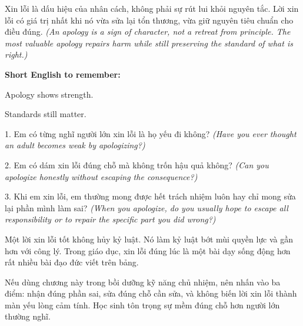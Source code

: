 \begin{baihoc}
Xin lỗi là dấu hiệu của nhân cách, không phải sự rút lui khỏi nguyên tắc. Lời xin lỗi có giá trị nhất khi nó vừa sửa lại tổn thương, vừa giữ nguyên tiêu chuẩn cho điều đúng.
\textit{(An apology is a sign of character, not a retreat from principle. The most valuable apology repairs harm while still preserving the standard of what is right.)}
\end{baihoc}

\begin{ghinhoanh}
\textbf{Short English to remember:}

Apology shows strength.

Standards still matter.
\end{ghinhoanh}

\begin{tuhocnhanh}
1. Em có từng nghĩ người lớn xin lỗi là họ yếu đi không? \textit{(Have you ever thought an adult becomes weak by apologizing?)}

2. Em có dám xin lỗi đúng chỗ mà không trốn hậu quả không? \textit{(Can you apologize honestly without escaping the consequence?)}

3. Khi em xin lỗi, em thường mong được hết trách nhiệm luôn hay chỉ mong sửa lại phần mình làm sai? \textit{(When you apologize, do you usually hope to escape all responsibility or to repair the specific part you did wrong?)}
\end{tuhocnhanh}

\begin{tongketchuong}
Một lời xin lỗi tốt không hủy kỷ luật. Nó làm kỷ luật bớt mùi quyền lực và gần hơn với công lý. Trong giáo dục, xin lỗi đúng lúc là một bài dạy sống động hơn rất nhiều bài đạo đức viết trên bảng.
\end{tongketchuong}

\begin{goigiaovien}
Nếu dùng chương này trong bồi dưỡng kỹ năng chủ nhiệm, nên nhấn vào ba điểm: nhận đúng phần sai, sửa đúng chỗ cần sửa, và không biến lời xin lỗi thành màn yếu lòng cảm tính. Học sinh tôn trọng sự mềm đúng chỗ hơn người lớn thường nghĩ.
\end{goigiaovien}

\ngancach